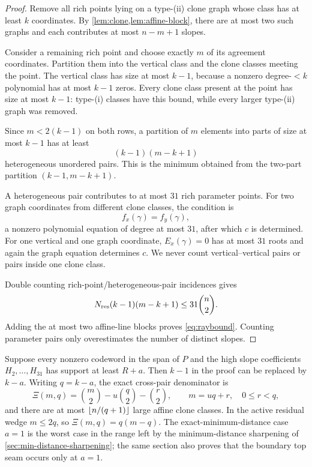\documentclass[11pt,a4paper]{amsart}
\numberwithin{equation}{section}
\theoremstyle{remark}
\begin{document}
\begin{proof}
Remove all rich points lying on a type-(ii) clone graph whose class has at least $k$ coordinates.  By \cref{lem:clone,lem:affine-block}, there are at most two such graphs and each contributes at most $n-m+1$ slopes.

Consider a remaining rich point and choose exactly $m$ of its agreement coordinates.  Partition them into the vertical class and the clone classes meeting the point.  The vertical class has size at most $k-1$, because a nonzero degree-$<k$ polynomial has at most $k-1$ zeros.  Every clone class present at the point has size at most $k-1$: type-(i) classes have this bound, while every larger type-(ii) graph was removed.

Since $m<2(k-1)$ on both rows, a partition of $m$ elements into parts of size at most $k-1$ has at least
\begin{equation}\label{eq:crosspairs}
 (k-1)(m-k+1)
\end{equation}
heterogeneous unordered pairs.  This is the minimum obtained from the two-part partition $(k-1,m-k+1)$.

A heterogeneous pair contributes to at most $31$ rich parameter points.  For two graph coordinates from different clone classes, the condition is
\[
 f_x(\gamma)=f_y(\gamma),
\]
a nonzero polynomial equation of degree at most $31$, after which $c$ is determined.  For one vertical and one graph coordinate, $E_x(\gamma)=0$ has at most $31$ roots and again the graph equation determines $c$.  We never count vertical--vertical pairs or pairs inside one clone class.

Double counting rich-point/heterogeneous-pair incidences gives
\[
 N_{\rm res}(k-1)(m-k+1)\le31\binom n2.
\]
Adding the at most two affine-line blocks proves \eqref{eq:raybound}.  Counting parameter pairs only overestimates the number of distinct slopes.
\end{proof}

\begin{remark}\label{rem:a-refine}
Suppose every nonzero codeword in the span of $P$ and the high slope coefficients $H_2,\ldots,H_{31}$ has support at least $R+a$.  Then $k-1$ in the proof can be replaced by $k-a$.  Writing $q=k-a$, the exact cross-pair denominator is
\[
 \Xi(m,q)=\binom m2-u\binom q2-\binom r2,
 \qquad m=uq+r,\quad0\le r<q,
\]
and there are at most $\left\lfloor n/(q+1)\right\rfloor$ large affine clone classes.  In the active residual wedge $m\le2q$, so $\Xi(m,q)=q(m-q)$.  The exact-minimum-distance case $a=1$ is the worst case in the range left by the minimum-distance sharpening of \cref{sec:min-distance-sharpening}; the same section also proves that the boundary top seam occurs only at $a=1$.
\end{remark}
\end{document}
